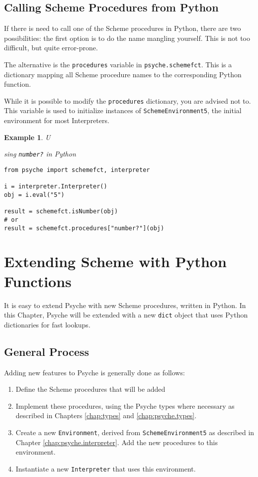 \documentclass{report}
\newcommand{\code}[1]{\texttt{#1}}
\newcommand{\file}[1]{\texttt{#1}}
\newtheorem{exmp}{Example}[chapter]
\newenvironment{example}[1]
    {\begin{exmp} \textup{#1}
       \begin{small}}
    {  \end{small}
     \end{exmp}}
\begin{document}
\section{Calling Scheme Procedures from Python}

If there is need to call one of the Scheme procedures in Python, there
are two possibilities: the first option is to do the name mangling
yourself. This is not too difficult, but quite error-prone.

The alternative is the \code{procedures} variable in
\file{psyche.schemefct}. This is a dictionary mapping all Scheme
procedure names to the corresponding Python function.

While it is possible to modify the \code{procedures} dictionary, you
are advised not to. This variable is used to initialize instances of
\code{SchemeEnvironment5}, the initial environment for most
Interpreters. 

\begin{example} Using \code{number?} in Python
\begin{verbatim}
from psyche import schemefct, interpreter

i = interpreter.Interpreter()
obj = i.eval("5")

result = schemefct.isNumber(obj)
# or
result = schemefct.procedures["number?"](obj)
\end{verbatim}
\end{example}


%
%
\chapter{Extending Scheme with Python Functions}
\label{chap:extending}
It is easy to extend Psyche with new Scheme procedures, written in
Python. In this Chapter, Psyche will be extended with a new
\code{dict} object that uses Python dictionaries for fast lookups. 

\section{General Process}
Adding new features to Psyche is generally done as follows:

\begin{enumerate}
\item Define the Scheme procedures that will be added
\item Implement these procedures, using the Psyche types where
    necessary as described in Chapters \ref{chap:types} and
    \ref{chap:psyche.types}. 
\item Create a new \code{Environment}, derived from
    \code{SchemeEnvironment5} as described in Chapter
    \ref{chap:psyche.interpreter}. Add the new procedures to this
    environment. 
\item Instantiate a new \code{Interpreter} that uses this environment.
\end{enumerate}
\end{document}

